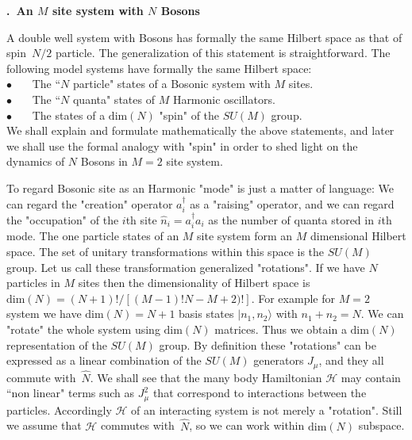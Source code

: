 \documentclass[onecolumn,fleqn, 11pt]{revtex4}
\newcommand{\bitem}{$\bullet$ \ \ \ }
\renewcommand{\thesubsection}{\arabic{subsection}}
\renewcommand{\thesubsubsection}{\arabic{subsubsection}}
\newcommand{\sheadC}[1]
{
\addtocounter{subsubsection}{1}
\vspace{5mm}
{\bf \thesubsection.\thesubsubsection \ #1}  
\nopagebreak
\phantomsection
}
\begin{document}
\sheadC{An $M$ site system with $N$ Bosons}

A double well system with Bosons has formally the same Hilbert space 
as that of spin~$N/2$ particle. 
The generalization of this statement is straightforward.   
The following model systems have formally the same Hilbert space: \\
 
\bitem The ``$N$ particle" states of a Bosonic system with $M$ sites. \\
\bitem The ``$N$ quanta" states of $M$ Harmonic oscillators. \\
\bitem The states of a $\mbox{dim}(N)$ "spin" of the $SU(M)$ group. \\

We shall explain and formulate mathematically the above statements, 
and later we shall use the formal analogy with "spin" in order to shed 
light on the dynamics of $N$ Bosons in ${M=2}$ site system. 

To regard Bosonic site as an Harmonic "mode"  
is just a matter of language: 
We can regard the "creation" operator $a_i^{\dagger}$
as a "raising" operator, and we can regard the "occupation" 
of the $i$th site $\hat{n}_i= a_i^{\dagger}a_i$ 
as the number of quanta stored in $i$th mode. 
The one particle states of an $M$ site system form 
an $M$ dimensional Hilbert space. The set of unitary 
transformations within this space is the $SU(M)$ group.
Let us call these transformation generalized "rotations". 
If we have $N$ particles in $M$ sites then 
the dimensionality of Hilbert space is ${\mbox{dim}(N)=(N{+}1)!/[(M{-}1)!N{-}M{+}2)!]}$.
For example for $M=2$ system we have ${\mbox{dim}(N)=N{+}1}$ 
basis states ${|n_1,n_2\rangle}$ with ${n_1+n_2=N}$. 
We can "rotate" the whole system using $\mbox{dim}(N)$
matrices. Thus we obtain a $\mbox{dim}(N)$ representation of the $SU(M)$ group. 
By definition these "rotations" can be expressed as a linear combination 
of the $SU(M)$ generators $J_{\mu}$, and they all commute with~$\hat{N}$.
We shall see that the many body Hamiltonian $\mathcal{H}$ may contain ``non linear" 
terms such as ${J_{\mu}^2}$ that correspond to interactions 
between the particles. Accordingly $\mathcal{H}$ of an interacting 
system is not merely a "rotation". 
Still we assume that $\mathcal{H}$ commutes with~$\hat{N}$, 
so we can work within $\mbox{dim}(N)$ subspace.
\end{document}
